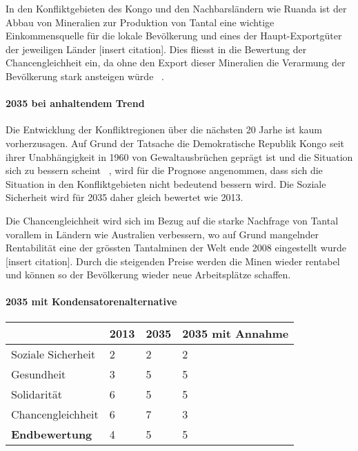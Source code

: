 In den Konfliktgebieten des Kongo und den Nachbarsländern wie Ruanda ist der Abbau von 
Mineralien zur Produktion von Tantal eine wichtige Einkommensquelle für die lokale Bevölkerung
und eines der Haupt-Exportgüter der jeweiligen Länder [insert citation]. Dies fliesst in
die Bewertung der Chancengleichheit ein, da ohne den Export dieser Mineralien die Verarmung
der Bevölkerung stark ansteigen würde ~\cite{DRCongo35}.

\paragraph{2035 bei anhaltendem Trend} Die Entwicklung der Konfliktregionen über die nächsten 20 Jarhe
ist kaum vorherzusagen. Auf Grund der Tatsache die Demokratische Republik Kongo seit ihrer Unabhängigkeit
in 1960 von Gewaltausbrüchen geprägt ist und die Situation sich zu bessern scheint ~\cite{Demokrat2}, wird für die 
Prognose angenommen, dass sich die Situation in den Konfliktgebieten nicht bedeutend bessern wird.
Die Soziale Sicherheit wird für 2035 daher gleich bewertet wie 2013. 


Die Chancengleichheit wird sich im Bezug auf die starke Nachfrage von Tantal vorallem in Ländern wie
Australien verbessern, wo auf Grund mangelnder Rentabilität eine der grössten Tantalminen der Welt ende 2008 
eingestellt wurde [insert citation]. Durch die steigenden Preise werden die Minen wieder rentabel und 
können so der Bevölkerung wieder neue Arbeitsplätze schaffen.  


\paragraph{2035 mit Kondensatorenalternative}


\begin{table}[h]
    \centering
    \begin{tabular}{l|lll} & \textbf{2013} & \textbf{2035} &  \textbf{2035 mit Annahme} 
        \\ \hline Soziale Sicherheit    & 2  & 2  & 2
        \\ Gesundheit                   & 3  & 5  & 5
        \\ Solidarität                  & 6  & 5  & 5
        \\ Chancengleichheit            & 6  & 7  & 3
        \\ \hline \textbf{Endbewertung} & 4  & 5  & 5
    \end{tabular}
\end{table}
